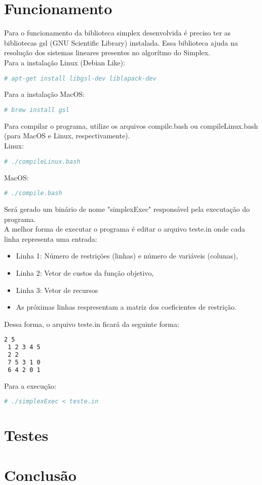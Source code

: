 \documentclass[a4paper]{article}
\begin{document}
\section{Funcionamento}
Para o funcionamento da biblioteca simplex desenvolvida \'e preciso ter as bibliotecas gsl (GNU Scientific Library) instalada. Essa biblioteca ajuda na resolu\c{c}\~ao dos sistemas lineares presentes no algor\'itmo do Simplex.\\
Para a instala\c{c}\~ao Linux (Debian Like):
\begin{lstlisting}[language=bash]
  # apt-get install libgsl-dev liblapack-dev
\end{lstlisting}
Para a instala\c{c}\~ao MacOS:
\begin{lstlisting}[language=bash]
  # brew install gsl 
\end{lstlisting}
Para compilar o programa, utilize os arquivos compile.bash ou compileLinux.bash (para MacOS e Linux, respectivamente).
\\
Linux:
\begin{lstlisting}[language=bash]
  # ./compileLinux.bash 
\end{lstlisting}
MacOS:
\begin{lstlisting}[language=bash]
  # ./compile.bash 
\end{lstlisting}
Ser\'a gerado um bin\'ario de nome "simplexExec" respons\'avel pela executa\c{c}\~ao do programa.
\\
A melhor forma de executar o programa \'e editar o arquivo teste.in onde cada linha representa uma entrada:
\\
\begin{itemize}
\item Linha 1: N\'umero de restri\c{c}\~oes (linhas) e n\'umero de vari\'aveis (colunas),
\item Linha 2: Vetor de custos da fun\c{c}\~ao objetivo,
\item Linha 3: Vetor de recursos
\item As pr\'oximas linhas respresentam a matriz dos coeficientes de restri\c{c}\~ao.
\end{itemize}
Dessa forma, o arquivo teste.in ficar\'a da seguinte forma:
\begin{lstlisting}[language=bash]
 2 5
 1 2 3 4 5
 2 2
 7 5 3 1 0
 6 4 2 0 1
\end{lstlisting}
Para a execu\c{c}\~ao:
\begin{lstlisting}[language=bash]
  # ./simplexExec < teste.in
\end{lstlisting}

\section{Testes}
\section{Conclus\~ao}
\end{document}
